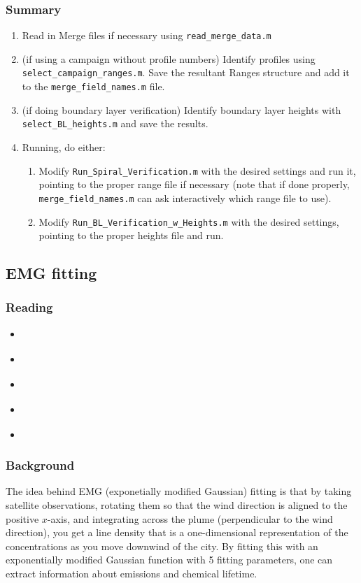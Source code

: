 \documentclass[12pt]{article}
\begin{document}
		\subsubsection{Summary}		
		\begin{enumerate}
		\item Read in Merge files if necessary using \lstinline$read_merge_data.m$
		
		\item (if using a campaign without profile numbers) Identify profiles using \lstinline$select_campaign_ranges.m$. Save the resultant Ranges structure and add it to the \lstinline$merge_field_names.m$ file.
		
		\item (if doing boundary layer verification) Identify boundary layer heights with \lstinline$select_BL_heights.m$ and save the results.
		
		\item Running, do either:
			\begin{enumerate}
			\item Modify \lstinline$Run_Spiral_Verification.m$ with the desired settings and run it, pointing to the proper range file if necessary (note that if done properly, \lstinline$merge_field_names.m$ can ask interactively which range file to use).
			\item Modify \lstinline$Run_BL_Verification_w_Heights.m$ with the desired settings, pointing to the proper heights file and run.
			\end{enumerate}
		\end{enumerate}
	
	
	\subsection{EMG fitting}
		\subsubsection{Reading}
		\begin{itemize}
		\item \citealt{beirle11}
		\item \citealt{valin13}
		\item \citealt{deFoy14}
		\item \citealt{lu15}
		\item \citealt{laughner16}
		\end{itemize}
		
		\subsubsection{Background}
		The idea behind EMG (exponetially modified Gaussian) fitting is that by taking satellite  observations, rotating them so that the wind direction is aligned to the positive $x$-axis, and integrating across the plume (perpendicular to the wind direction), you get a line density that is a one-dimensional representation of the  concentrations as you move downwind of the city. By fitting this with an exponentially modified Gaussian function with 5 fitting parameters, one can extract information about emissions and chemical lifetime.
		
\end{document}
